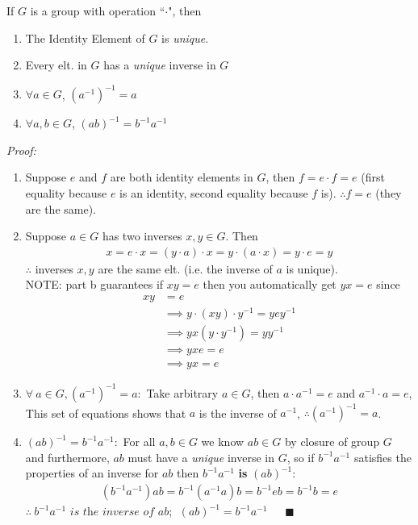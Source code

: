 \begin{lemma}
If $G$ is a group with operation ``$\cdot$", then
\begin{enumerate}[label=\alph*)]
    \item The Identity Element of $G$ is \textit{unique}.
    \item Every elt. in $G$ has a \textit{unique} inverse in $G$
    \item $\forall a \in G$, $(a^{-1})^{-1}=a$
    \item $\forall a,b \in G$, $(ab)^{-1}=b^{-1}a^{-1}$
\end{enumerate}
\textit{Proof:}
\begin{enumerate}[label=\alph*)]
    \item Suppose $e$ and $f$ are both identity elements in $G$, then $f=e\cdot f=e$ (first equality because $e$ is an identity, second equality because $f$ is). $\therefore f=e$ (they are the same).
    \item Suppose $a\in G$ has two inverses $x,y \in G$. Then
    \begin{align}
        x=e\cdot x=(y\cdot a)\cdot x = y\cdot(a\cdot x)=y\cdot e=y\nonumber
    \end{align}
    $\therefore $ inverses $x,y$ are the same elt. (i.e. the inverse of $a$ is unique).\\ 
    \noindent NOTE: part b guarantees if $xy=e$ then you automatically get $yx=e$ since
    \begin{align}
        xy&=e \nonumber \\
        &\implies y\cdot (xy)\cdot y^{-1} = yey^{-1} \nonumber \\
        &\implies yx(y\cdot y^{-1})= yy^{-1} \nonumber \\
        &\implies yxe=e \nonumber \\
        &\implies yx=e \nonumber
    \end{align}
    \item $\forall \ a \in G, (a^{-1})^{-1}=a:$ Take arbitrary $a\in G$, then $a\cdot a^{-1}=e$ and $a^{-1}\cdot a= e$, This set of equations shows that $a$ is the inverse of $a^{-1}$, $\therefore (a^{-1})^{-1}=a$.
    \item $(ab)^{-1}=b^{-1}a^{-1}:$ For all $a,b\in G$ we know $ab\in G$ by closure of group $G$ and furthermore, $ab$ must have a \textit{unique} inverse in $G$, so if $b^{-1}a^{-1}$ satisfies the properties of an inverse for $ab$ then $b^{-1}a^{-1}$ \textbf{is} $(ab)^{-1}$:
    \begin{align}
        (b^{-1}a^{-1})ab= b^{-1}(a^{-1}a)b=b^{-1}eb=b^{-1}b=e \nonumber
    \end{align}
    $\therefore \ b^{-1}a^{-1} \textit{ is the inverse of } ab; \ \ (ab)^{-1}=b^{-1}a^{-1} \ \ \ \ \ \ \ \blacksquare$
\end{enumerate}
\end{lemma}

